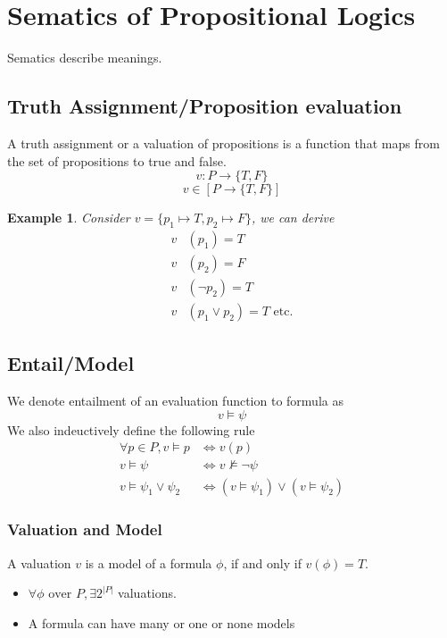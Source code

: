 \documentclass{article}
\newtheorem{example}[theorem]{Example}
\newtheorem{definition}[theorem]{Definition}
\let\olddefinition\definition
\let\endolddefinition\enddefinition
\renewenvironment{definition}
  {\begin{tcolorbox}[
      colback=red!10,
      colframe=red!50!black,
      boxrule=0.6pt,
      arc=2pt,
      left=6pt,right=6pt,top=4pt,bottom=4pt,
      breakable
    ]\olddefinition}
  {\endolddefinition\end{tcolorbox}}
\begin{document}
\section{Sematics of Propositional Logics}
\begin{definition}
    Sematics describe meanings.
\end{definition}
\subsection{Truth Assignment/Proposition evaluation}
A truth assignment or a valuation of propositions is a function that maps from the set of propositions to true and false.
\[v: P \rightarrow \{T, F\}\]
\[v \in [P \rightarrow \{T, F\}]\]
\begin{example}
    Consider $v = \{p_1 \mapsto T, p_2 \mapsto F\}$, we can derive
    \begin{align*}
    v&(p_1) = T\\
    v&(p_2)= F\\
    v&(\neg p_2) = T\\
    v&(p_1\lor p_2) = T \text{ etc.}
    \end{align*}
\end{example}
\subsection{Entail/Model}
We denote entailment of an evaluation function to formula as 
\[v \models \psi\]
We also indeuctively define the following rule 
\begin{align*}
    \forall p \in P, v\models p &\iff v(p)\\
     v\models \psi &\iff v\nvDash \neg \psi\\
     v \models \psi_1 \lor \psi_2 &\iff (v\models \psi_1) \lor (v\models \psi_2)
\end{align*}
\subsubsection{Valuation and Model}
A valuation $v$ is a model of a formula $\phi$, if and only if $v(\phi) = T$. 
\begin{itemize}
    \item $\forall \phi \text{ over } P, \exists 2^{|P|}$ valuations.
    \item A formula can have many or one or none models 
\end{itemize}
\end{document}
